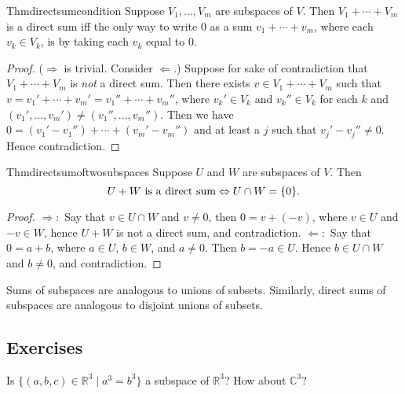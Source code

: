 \begin{reference}{Thm}{directsumcondition}
  Suppose $V_1,\dots,V_m$ are subspaces of $V$. Then $V_1+\cdots+V_m$ is a direct sum iff the only way to write 0 as a sum $v_1+\cdots+v_m$, where each $v_k\in V_k$, is by taking each $v_k$ equal to 0.
\end{reference}

\begin{proof}
  ($\Rightarrow$ is trivial. Consider $\Leftarrow$.)
  Suppose for sake of contradiction that $V_1+\cdots+V_m$ is \textit{not} a direct sum. Then there exists $v\in V_1+\cdots+V_m$ such that $v=v_1'+\cdots+v_m'=v_1''+\cdots+v_m''$, where $v_k'\in V_k$ and $v_k''\in V_k$ for each $k$ and $(v_1',\dots,v_m')\neq(v_1'',\dots,v_m'')$. Then we have $0=(v_1'-v_1'')+\cdots+(v_m'-v_m'')$ and at least a $j$ such that $v_j'-v_j''\neq0$. Hence contradiction.
\end{proof}

\begin{reference}{Thm}{directsumoftwosubspaces}
  Suppose $U$ and $W$ are subspaces of $V$. Then
  \[
    U+W\text{ is a direct sum}\Leftrightarrow U\cap W=\{0\}.\qedhere
  \]
\end{reference}

\begin{proof}
  $\Rightarrow:$ Say that $v\in U\cap W$ and $v\neq0$, then $0=v+(-v)$, where $v\in U$ and $-v\in W$, hence $U+W$ is not a direct sum, and contradiction.\newline
  $\Leftarrow:$ Say that $0=a+b$, where $a\in U$, $b\in W$, and $a\neq 0$. Then $b=-a\in U$. Hence $b\in U\cap W$ and $b\neq 0$, and contradiction.
\end{proof}

Sums of subspaces are analogous to unions of subsets. Similarly, direct sums of subspaces are analogous to disjoint unions of subsets.


\subsection*{Exercises}

\setcounter{exercise}{5}

\begin{exercise}
  Is $\{(a,b,c)\in \mathbb R^3\mid a^3=b^3\}$ a subspace of $\mathbb R^3$? How about $\mathbb C^3$?
\end{exercise}

